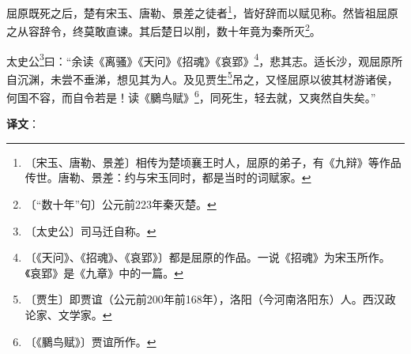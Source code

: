 \documentclass[12pt,UTF-8,openany,a4]{ctexbook}
\begin{document}
\begin{large}
    屈原既死之后，楚有宋玉、唐勒、景差之徒者\footnote{〔宋玉、唐勒、景差〕\yiwen 相传为楚顷襄王时人，屈原的弟子，有《九辩》等作品传世。唐勒、景差：约与宋玉同时，都是当时的词赋家。}，皆好辞而以赋见称。然皆祖屈原之从容辞令，终莫敢直谏。其后楚日以削，数十年竟为秦所灭\footnote{〔“数十年”句〕\yiwen 公元前223年秦灭楚。}。
    
    太史公\footnote{〔太史公〕\yiwen 司马迁自称。}曰：“余读《离骚》《天问》《招魂》《哀郢》\footnote{〔《天问》、《招魂》、《哀郢》〕\yiwen 都是屈原的作品。一说《招魂》为宋玉所作。《哀郢》是《九章》中的一篇。}，悲其志。适长沙，观屈原所自沉渊，未尝不垂涕，想见其为人。及见贾生\footnote{〔贾生〕\yiwen 即贾谊（公元前200年前168年），洛阳（今河南洛阳东）人。西汉政论家、文学家。}吊之，又怪屈原以彼其材游诸侯，何国不容，而自令若是！读《鵩鸟赋》\footnote{〔《鵩鸟赋》〕\yiwen 贾谊所作。}，同死生，轻去就，又爽然自失矣。”

\end{large}


\newpage

\begin{Large}
   \noindent \textbf{译文}：
\end{Large}

\vspace{1em}
\end{document}
